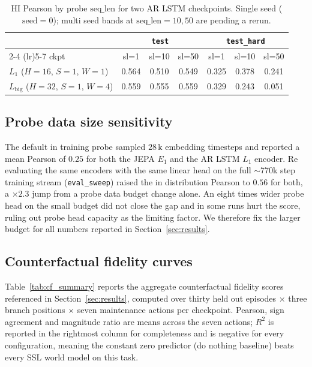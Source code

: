 \begin{table}[h]
\centering
\small
\caption{HI Pearson by probe $\mathrm{seq\_len}$ for two AR LSTM
checkpoints. Single seed ($\mathrm{seed}{=}0$); multi seed bands at
$\mathrm{seq\_len}{=}10, 50$ are pending a rerun.}
\label{tab:seqlen_compare}
\begin{tabular}{l c c c c c c}
\toprule
       & \multicolumn{3}{c}{\texttt{test}} & \multicolumn{3}{c}{\texttt{test\_hard}} \\
\cmidrule(lr){2-4} \cmidrule(lr){5-7}
ckpt   & sl=1 & sl=10 & sl=50 & sl=1 & sl=10 & sl=50 \\
\midrule
$L_1$ ($H{=}16$, $S{=}1$, $W{=}1$) & 0.564 & 0.510 & 0.549 & 0.325 & 0.378 & 0.241 \\
$L_\mathrm{big}$ ($H{=}32$, $S{=}1$, $W{=}4$) & 0.559 & 0.555 & 0.559 & 0.329 & 0.243 & 0.051 \\
\bottomrule
\end{tabular}
\end{table}

\subsection{Probe data size sensitivity}
\label{sec:probe_size}

The default in training probe sampled $28\,\text{k}$ embedding
timesteps and reported a mean Pearson of $0.25$ for both the JEPA $E_1$
and the AR LSTM $L_1$ encoder. Re evaluating the same encoders with
the same linear head on the full $\sim$770k step training stream
(\texttt{eval\_sweep}) raised the in distribution Pearson to $0.56$ for
both, a $\times 2.3$ jump from a probe data budget change alone. An
eight times wider probe head on the small budget did not close the gap
and in some runs hurt the score, ruling out probe head capacity as the
limiting factor. We therefore fix the larger budget for all numbers
reported in Section~\ref{sec:results}.

\subsection{Counterfactual fidelity curves}
\label{sec:counterfactual_curves}

Table~\ref{tab:cf_summary} reports the aggregate counterfactual
fidelity scores referenced in Section~\ref{sec:results}, computed over
thirty held out episodes $\times$ three branch positions $\times$ seven
maintenance actions per checkpoint. Pearson, sign agreement and
magnitude ratio are means across the seven actions; $R^2$ is reported
in the rightmost column for completeness and is negative for every
configuration, meaning the constant zero predictor (do nothing baseline)
beats every SSL world model on this task.

